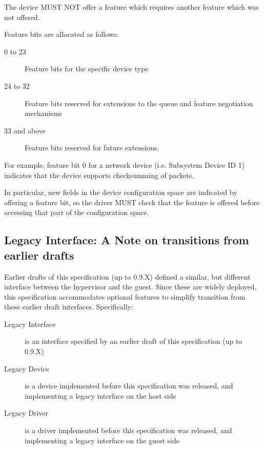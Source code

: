 The device MUST NOT offer a feature which requires another feature
which was not offered.

Feature bits are allocated as follows:

\begin{description}
\item[0 to 23] Feature bits for the specific device type

\item[24 to 32] Feature bits reserved for extensions to the queue and
  feature negotiation mechanisms

\item[33 and above] Feature bits reserved for future extensions.
\end{description}

For example, feature bit 0 for a network device (i.e. Subsystem
Device ID 1) indicates that the device supports checksumming of
packets.

In particular, new fields in the device configuration space are
indicated by offering a feature bit, so the driver MUST check that the
feature is offered before accessing that part of the configuration
space.

\subsection{Legacy Interface: A Note on transitions from earlier drafts}\label{sec:Basic Facilities of a Virtio Device / Feature Bits / Legacy Interface: A Note on transitions from earlier drafts}

Earlier drafts of this specification (up to 0.9.X) defined a similar, but
different interface between the hypervisor and the guest.
Since these are widely deployed, this specification
accommodates optional features to simplify transition
from these earlier draft interfaces. Specifically:

\begin{description}
\item[Legacy Interface]
        is an interface specified by an earlier draft of this specification
        (up to 0.9.X)
\item[Legacy Device]
        is a device implemented before this specification was released,
        and implementing a legacy interface on the host side
\item[Legacy Driver]
        is a driver implemented before this specification was released,
        and implementing a legacy interface on the guest side
\end{description}


